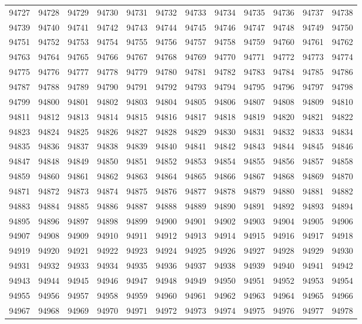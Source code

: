 \begin{center}
\begin{longtable}{llllllllllll}
94727 &94728 &94729 &94730 &94731 &94732 &94733 &94734 &94735 &94736 &94737 &94738 \\
94739 &94740 &94741 &94742 &94743 &94744 &94745 &94746 &94747 &94748 &94749 &94750 \\
94751 &94752 &94753 &94754 &94755 &94756 &94757 &94758 &94759 &94760 &94761 &94762 \\
94763 &94764 &94765 &94766 &94767 &94768 &94769 &94770 &94771 &94772 &94773 &94774 \\
94775 &94776 &94777 &94778 &94779 &94780 &94781 &94782 &94783 &94784 &94785 &94786 \\
94787 &94788 &94789 &94790 &94791 &94792 &94793 &94794 &94795 &94796 &94797 &94798 \\
94799 &94800 &94801 &94802 &94803 &94804 &94805 &94806 &94807 &94808 &94809 &94810 \\
94811 &94812 &94813 &94814 &94815 &94816 &94817 &94818 &94819 &94820 &94821 &94822 \\
94823 &94824 &94825 &94826 &94827 &94828 &94829 &94830 &94831 &94832 &94833 &94834 \\
94835 &94836 &94837 &94838 &94839 &94840 &94841 &94842 &94843 &94844 &94845 &94846 \\
94847 &94848 &94849 &94850 &94851 &94852 &94853 &94854 &94855 &94856 &94857 &94858 \\
94859 &94860 &94861 &94862 &94863 &94864 &94865 &94866 &94867 &94868 &94869 &94870 \\
94871 &94872 &94873 &94874 &94875 &94876 &94877 &94878 &94879 &94880 &94881 &94882 \\
94883 &94884 &94885 &94886 &94887 &94888 &94889 &94890 &94891 &94892 &94893 &94894 \\
94895 &94896 &94897 &94898 &94899 &94900 &94901 &94902 &94903 &94904 &94905 &94906 \\
94907 &94908 &94909 &94910 &94911 &94912 &94913 &94914 &94915 &94916 &94917 &94918 \\
94919 &94920 &94921 &94922 &94923 &94924 &94925 &94926 &94927 &94928 &94929 &94930 \\
94931 &94932 &94933 &94934 &94935 &94936 &94937 &94938 &94939 &94940 &94941 &94942 \\
94943 &94944 &94945 &94946 &94947 &94948 &94949 &94950 &94951 &94952 &94953 &94954 \\
94955 &94956 &94957 &94958 &94959 &94960 &94961 &94962 &94963 &94964 &94965 &94966 \\
94967 &94968 &94969 &94970 &94971 &94972 &94973 &94974 &94975 &94976 &94977 &94978 \\

\end{longtable}
\end{center}
